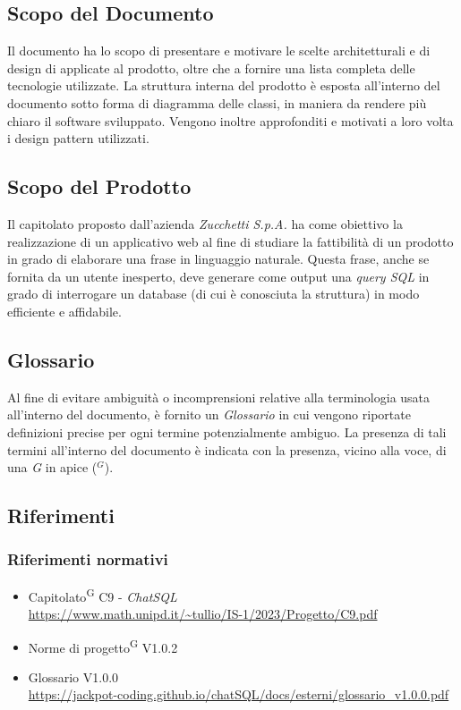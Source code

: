 \documentclass[5pt]{article}
\begin{document}
	\subsection{Scopo del Documento}

    Il documento ha lo scopo di presentare e motivare le scelte architetturali e di design di applicate al prodotto, oltre che a fornire una lista completa delle tecnologie utilizzate. La struttura interna del prodotto è esposta all'interno del documento sotto forma di diagramma delle classi, in maniera da rendere più chiaro il software sviluppato. Vengono inoltre approfonditi e motivati a loro volta i design pattern utilizzati. 
	
	\subsection{Scopo del Prodotto}
    Il capitolato proposto dall'azienda \textit{Zucchetti S.p.A.} ha come obiettivo la realizzazione di un applicativo web al fine di studiare la fattibilità di un prodotto in grado di elaborare una frase in linguaggio naturale. Questa frase, anche se fornita da un utente inesperto, deve generare come output una \textit{query SQL} in grado di interrogare un database (di cui è conosciuta la struttura) in modo efficiente e affidabile.
	
	\subsection{Glossario}
    Al fine di evitare ambiguità o incomprensioni relative alla terminologia usata all'interno del documento, è fornito un \textit{Glossario} in cui vengono riportate definizioni precise per ogni termine potenzialmente ambiguo. La presenza di tali termini all'interno del documento è indicata con la presenza, vicino alla voce, di una \textit{G} in apice ($^G$). 
	\subsection{Riferimenti}
	\subsubsection{Riferimenti normativi}
	\begin{itemize}
		\item Capitolato\textsuperscript{G} C9 - \textit{ChatSQL} \\ \url{https://www.math.unipd.it/~tullio/IS-1/2023/Progetto/C9.pdf}
		\item Norme di progetto\textsuperscript{G} V1.0.2
		\item Glossario V1.0.0 \\
		\url{https://jackpot-coding.github.io/chatSQL/docs/esterni/glossario_v1.0.0.pdf}
	\end{itemize}
\end{document}
